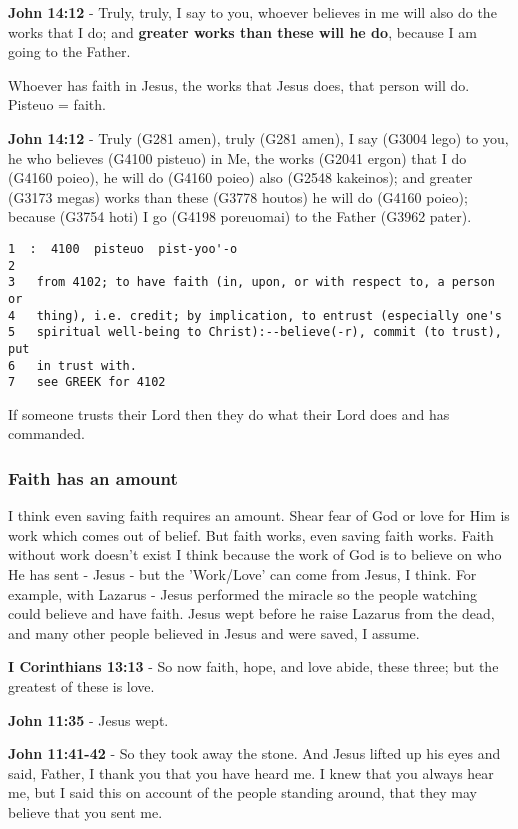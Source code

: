 \documentclass[11pt]{article}
\begin{document}
\textbf{John 14:12} - Truly, truly, I say to you, whoever believes in me will also do the works that I do; and \textbf{greater works than these will he do}, because I am going to the Father.

Whoever has faith in Jesus, the works that Jesus does, that person will do.
Pisteuo = faith.

\textbf{John 14:12} - Truly (G281 amen), truly (G281 amen), I say (G3004 lego) to you, he who believes (G4100 pisteuo) in Me, the works (G2041 ergon) that I do (G4160 poieo), he will do (G4160 poieo) also (G2548 kakeinos); and greater (G3173 megas) works than these (G3778 houtos) he will do (G4160 poieo); because (G3754 hoti) I go (G4198 poreuomai) to the Father (G3962 pater).

\begin{verbatim}
1  :  4100  pisteuo  pist-yoo'-o
2  
3   from 4102; to have faith (in, upon, or with respect to, a person or
4   thing), i.e. credit; by implication, to entrust (especially one's
5   spiritual well-being to Christ):--believe(-r), commit (to trust), put
6   in trust with.
7   see GREEK for 4102
\end{verbatim}

If someone trusts their Lord then they do what their Lord does and has commanded.

\subsubsection{Faith has an amount}
\label{sec:org55427e2}

I think even saving faith requires an amount.
Shear fear of God or love for Him is work which comes out of belief.
But faith works, even saving faith works.
Faith without work doesn't exist I think because the work of God is to believe on who He has sent - Jesus - but the 'Work/Love' can come from Jesus, I think.
For example, with Lazarus - Jesus performed the miracle so the people watching could believe and have faith.
Jesus wept before he raise Lazarus from the dead, and many other people believed in Jesus and were saved, I assume.

\textbf{I Corinthians 13:13} - So now faith, hope, and love abide, these three; but the greatest of these is love.

\textbf{John 11:35} - Jesus wept.

\textbf{John 11:41-42} - So they took away the stone. And Jesus lifted up his eyes and said, Father, I thank you that you have heard me. I knew that you always hear me, but I said this on account of the people standing around, that they may believe that you sent me.
\end{document}
